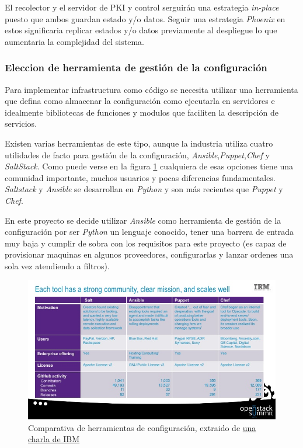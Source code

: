El recolector y el servidor de PKI y control serguirán una estrategia \emph{in-place} puesto que ambos guardan estado y/o datos. Seguir una estrategia \emph{Phoenix} en estos
significaria replicar estados y/o datos previamente al despliegue lo que aumentaria la complejidad del sistema.

\subsubsection{Eleccion de herramienta de gestión de la configuración}

Para implementar infrastructura como código se necesita utilizar una herramienta que defina como almacenar la configuración
como ejecutarla en servidores e idealmente bibliotecas de funciones y modulos que faciliten la descripción de servicios.

Existen varias herramientas de este tipo, aunque la industria utiliza cuatro utilidades de facto para gestión de la configuración, \emph{Ansible},\emph{Puppet},\emph{Chef}
y  \emph{SaltStack}. Como puede verse en la figura \ref{fig:configmanagement1} cualquiera de esas opciones tiene una comunidad importante, muchos usuarios y pocas diferencias
fundamentales. \emph{Saltstack} y \emph{Ansible} se desarrollan en \emph{Python} y son más recientes que \emph{Puppet} y \emph{Chef}.

En este proyecto se decide utilizar \emph{Ansible} como herramienta de gestión de la configuración por ser \emph{Python} un lenguaje conocido, tener una barrera de entrada muy baja
y cumplir de sobra con los requisitos para este proyecto (es capaz de provisionar maquinas en algunos proveedores, configurarlas y lanzar ordenes una sola vez atendiendo a filtros).

\begin{figure}[h]
    \centering
      \includegraphics[scale=0.5]{images/configmanagement_tools1}
    \caption{Comparativa de herramientas de configuración, extraido de \href{https://www.slideshare.net/DanielKrook/caps-whats-best-for-deploying-and-managing-openstack-chef-vs-ansible-vs-puppet-vs-salt}{una charla de IBM}}
    \label{fig:configmanagement1}
  \end{figure}

